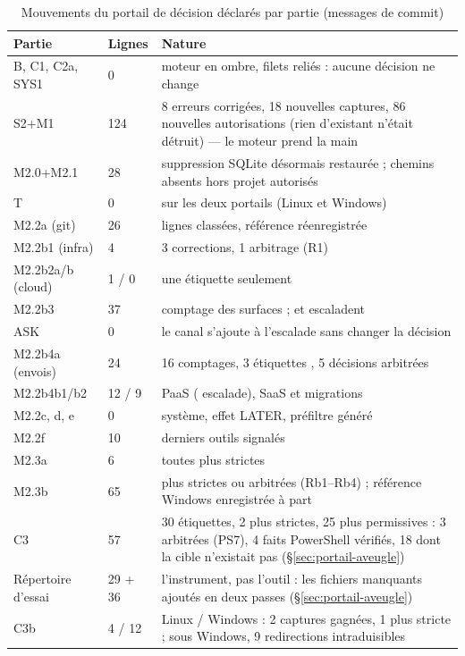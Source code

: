 \begin{table}[htbp]
\centering
\caption{Mouvements du portail de décision déclarés par partie (messages de commit)}
\label{tab:portail}
\small
\begin{tabularx}{\linewidth}{@{}L{2.6cm}L{2.3cm}Y@{}}
\toprule
\textbf{Partie} & \textbf{Lignes} & \textbf{Nature} \\
\midrule
B, C1, C2a, SYS1 & 0 & moteur en ombre, filets reliés : aucune décision ne change \\
S2+M1 & 124 & 8 erreurs corrigées, 18 nouvelles captures, 86 nouvelles autorisations (rien
  d'existant n'était détruit) --- le moteur prend la main \\
M2.0+M2.1 & 28 & suppression SQLite désormais restaurée ; chemins absents hors projet autorisés \\
T & 0 & sur les deux portails (Linux et Windows) \\
M2.2a (git) & 26 & lignes classées, référence réenregistrée \\
M2.2b1 (infra) & 4 & 3 corrections, 1 arbitrage (R1) \\
M2.2b2a/b (cloud) & 1 / 0 & une étiquette seulement \\
M2.2b3 & 37 & comptage des surfaces ;  et  escaladent \\
ASK & 0 & le canal s'ajoute à l'escalade sans changer la décision \\
M2.2b4a (envois) & 24 & 16 comptages, 3 étiquettes , 5 décisions arbitrées \\
M2.2b4b1/b2 & 12 / 9 & PaaS ( escalade), SaaS et migrations \\
M2.2c, d, e & 0 & système, effet LATER, préfiltre généré \\
M2.2f & 10 & derniers outils signalés \\
M2.3a & 6 & toutes plus strictes \\
M2.3b & 65 & plus strictes ou arbitrées (Rb1--Rb4) ; référence Windows enregistrée à part \\
C3 & 57 & 30 étiquettes, 2 plus strictes, 25 plus permissives : 3 arbitrées (PS7), 4 faits
  PowerShell vérifiés, 18 dont la cible n'existait pas (§\ref{sec:portail-aveugle}) \\
Répertoire d'essai & 29 + 36 & l'instrument, pas l'outil : les fichiers manquants ajoutés en
  deux passes (§\ref{sec:portail-aveugle}) \\
C3b & 4 / 12 & Linux / Windows : 2 captures gagnées, 1 plus stricte ; sous Windows, 9
  redirections  intraduisibles \\
\bottomrule
\end{tabularx}
\end{table}

